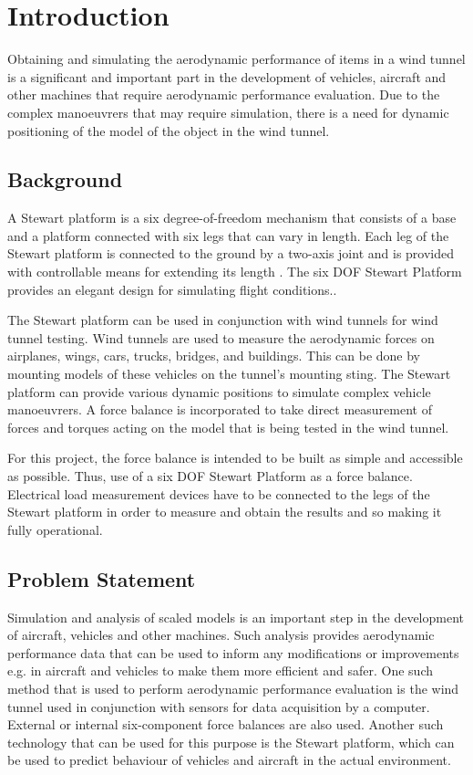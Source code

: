 \chapter{Introduction}
\label{sec:introduction}
Obtaining and simulating the aerodynamic performance of items in a wind tunnel is a
significant and important part in the development of vehicles, aircraft and other machines
that require aerodynamic performance evaluation. Due to the complex manoeuvrers that
may require simulation, there is a need for dynamic positioning of the model of the object
in the wind tunnel.
\section{Background}
A Stewart platform is a six degree-of-freedom mechanism that consists of a base and a platform connected with six legs that can vary in length. Each leg of the Stewart platform is connected to the ground by a two-axis joint and is provided with controllable means for extending its length
\cite{wittenburg2016stewart}. The six DOF Stewart Platform provides an elegant design for simulating flight conditions.\cite{stewart1965platform}. 

The Stewart platform can be used in conjunction with wind tunnels for wind tunnel testing. Wind tunnels are used to measure the aerodynamic forces on airplanes, wings, cars, trucks, bridges, and buildings. This can be done by mounting models of these vehicles on the tunnel's mounting sting. The Stewart platform can provide various dynamic positions to simulate complex vehicle manoeuvrers. A force balance is incorporated to take direct measurement of forces and torques acting on the model that is being tested in the wind tunnel.

For this project, the force balance is intended to be built as simple and accessible as possible. Thus, use of a six DOF Stewart Platform as a force balance. Electrical load measurement devices have to be connected to the legs of the Stewart platform in order to measure and obtain the results and so making it fully operational.

\section{Problem Statement}
Simulation and analysis of scaled models is an important step in the development of aircraft, vehicles and other machines. Such analysis provides aerodynamic performance data that can be used to inform any modifications or improvements e.g. in aircraft and vehicles to make them more efficient and safer. One such method that is used to perform aerodynamic performance evaluation is the wind tunnel used in conjunction with sensors for data acquisition by a computer. External or internal six-component force balances are also used. Another such technology that can be used for this purpose is the Stewart platform, which can be used to predict behaviour of vehicles and aircraft in the actual environment.

